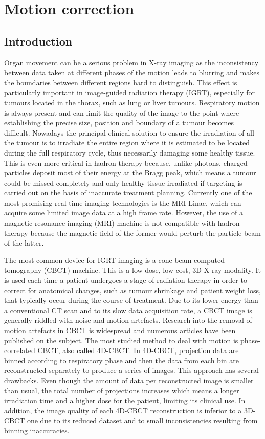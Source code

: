 \chapter{Motion correction}
\section{Introduction}
Organ movement can be a serious problem in X-ray imaging as the inconsistency between data taken at different phases of the motion leads to blurring and makes the boundaries between different regions hard to distinguish.  This effect is particularly important in image-guided radiation therapy (IGRT), especially for tumours located in the thorax, such as lung or liver tumours.  Respiratory motion is always present and can limit the quality of the image to the point where establishing the precise size, position and boundary of a tumour becomes difficult.  Nowadays the principal clinical solution to ensure the irradiation of all the tumour is to irradiate the entire region where it is estimated to be located during the full respiratory cycle, thus necessarily damaging some healthy tissue.  This is even more critical in hadron therapy because, unlike photons, charged particles deposit most of their energy at the Bragg peak, which means a tumour could be missed completely and only healthy tissue irradiated if targeting is carried out on the basis of inaccurate treatment planning.  Currently one of the most promising real-time imaging technologies is the MRI-Linac, which can acquire some limited image data at a high frame rate.  However, the use of a magnetic resonance imaging (MRI) machine is not compatible with hadron therapy because the magnetic field of the former would perturb the particle beam of the latter.

The most common device for IGRT imaging is a cone-beam computed tomography (CBCT) machine.  This is a low-dose, low-cost, 3D X-ray modality.  It is used each time a patient undergoes a stage of radiation therapy in order to correct for anatomical changes, such as tumour shrinkage and patient weight loss, that typically occur during the course of treatment.  Due to its lower energy than a conventional CT scan and to its slow data acquisition rate, a CBCT image is generally riddled with noise and motion artefacts.  Research into the removal of motion artefacts in CBCT is widespread and numerous articles have been published on the subject.  The most studied method to deal with motion is phase-correlated CBCT, also called 4D-CBCT\cite{sonke2005respiratory}\cite{thomas2006}\cite{li2006four}\cite{Pengpan2012246}\cite{t2016first}.  In 4D-CBCT, projection data are binned according to respiratory phase and then the data from each bin are reconstructed separately to produce a series of images.  This approach has several drawbacks.  Even though the amount of data per reconstructed image is smaller than usual, the total number of projections increases which means a longer irradiation time and a higher dose for the patient, limiting its clinical use.  In addition, the image quality of each 4D-CBCT reconstruction is inferior to a 3D-CBCT one due to its reduced dataset and to small inconsistencies resulting from binning inaccuracies. 


